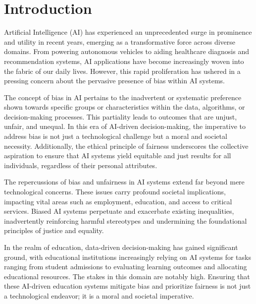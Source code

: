 \documentclass[12pt,a4paper,openright,twoside]{book}
\begin{document}
\mainmatter

\chapter{Introduction}
\label{chap:introduction}

Artificial Intelligence (AI) has experienced an unprecedented surge in prominence and utility in recent years, emerging as a transformative force across diverse domains. From powering autonomous vehicles to aiding healthcare diagnosis and recommendation systems, AI applications have become increasingly woven into the fabric of our daily lives. However, this rapid proliferation has ushered in a pressing concern about the pervasive presence of bias within AI systems.

The concept of bias in AI pertains to the inadvertent or systematic preference shown towards specific groups or characteristics within the data, algorithms, or decision-making processes. This partiality leads to outcomes that are unjust, unfair, and unequal. In this era of AI-driven decision-making, the imperative to address bias is not just a technological challenge but a moral and societal necessity. Additionally, the ethical principle of fairness underscores the collective aspiration to ensure that AI systems yield equitable and just results for all individuals, regardless of their personal attributes.

The repercussions of bias and unfairness in AI systems extend far beyond mere technological concerns. These issues carry profound societal implications, impacting vital areas such as employment, education, and access to critical services. Biased AI systems perpetuate and exacerbate existing inequalities, inadvertently reinforcing harmful stereotypes and undermining the foundational principles of justice and equality.

In the realm of education, data-driven decision-making has gained significant ground, with educational institutions increasingly relying on AI systems for tasks ranging from student admissions to evaluating learning outcomes and allocating educational resources. The stakes in this domain are notably high. Ensuring that these AI-driven education systems mitigate bias and prioritize fairness is not just a technological endeavor; it is a moral and societal imperative.
\end{document}
